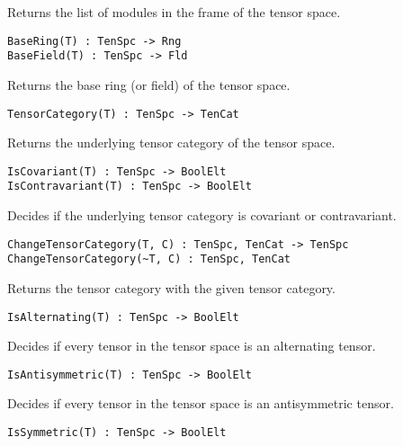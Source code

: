 Returns the list of modules in the frame of the tensor space.

\color{blue}
{\small \begin{verbatim}
BaseRing(T) : TenSpc -> Rng
BaseField(T) : TenSpc -> Fld
\end{verbatim} }
\color{black}

Returns the base ring (or field) of the tensor space.

\color{blue}
{\small \begin{verbatim}
TensorCategory(T) : TenSpc -> TenCat
\end{verbatim} }
\color{black}

Returns the underlying tensor category of the tensor space.

\color{blue}
{\small \begin{verbatim}
IsCovariant(T) : TenSpc -> BoolElt
IsContravariant(T) : TenSpc -> BoolElt
\end{verbatim} }
\color{black}

Decides if the underlying tensor category is covariant or contravariant.

\color{blue}
{\small \begin{verbatim}
ChangeTensorCategory(T, C) : TenSpc, TenCat -> TenSpc
ChangeTensorCategory(~T, C) : TenSpc, TenCat
\end{verbatim} }
\color{black}

Returns the tensor category with the given tensor category.

\color{blue}
{\small \begin{verbatim}
IsAlternating(T) : TenSpc -> BoolElt
\end{verbatim} }
\color{black}

Decides if every tensor in the tensor space is an alternating tensor.

\color{blue}
{\small \begin{verbatim}
IsAntisymmetric(T) : TenSpc -> BoolElt
\end{verbatim} }
\color{black}

Decides if every tensor in the tensor space is an antisymmetric tensor.

\color{blue}
{\small \begin{verbatim}
IsSymmetric(T) : TenSpc -> BoolElt
\end{verbatim} }
\color{black}

